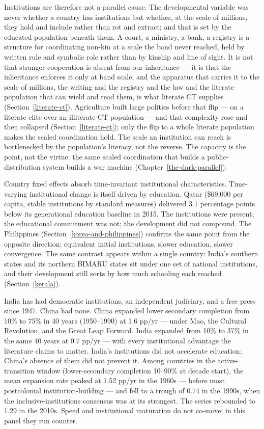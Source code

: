 \documentclass[12pt,letterpaper]{article}
\begin{document}
Institutions are therefore not a parallel cause. The developmental variable was never whether a country has institutions but whether, at the scale of millions, they hold and include rather than rot and extract; and that is set by the educated population beneath them. A court, a ministry, a bank, a registry is a structure for coordinating non-kin at a scale the band never reached, held by written rule and symbolic role rather than by kinship and line of sight. It is not that stranger-cooperation is absent from our inheritance --- it is that the inheritance enforces it only at band scale, and the apparatus that carries it to the scale of millions, the writing and the registry and the law and the literate population that can wield and read them, is what literate CT supplies (Section~\ref{literate-ct}). Agriculture built large polities before that flip --- on a literate elite over an illiterate-CT population --- and that complexity rose and then collapsed (Section~\ref{literate-ct}); only the flip to a whole literate population makes the scaled coordination hold. The scale an institution can reach is bottlenecked by the population's literacy, not the reverse. The capacity is the point, not the virtue: the same scaled coordination that builds a public-distribution system builds a war machine (Chapter~\ref{the-dark-parallel}).

Country fixed effects absorb time-invariant institutional characteristics. Time-varying institutional change is itself driven by education. Qatar (\$69,000 per capita, stable institutions by standard measures) delivered 3.1 percentage points below its generational education baseline in 2015. The institutions were present; the educational commitment was not; the development did not compound. The Philippines (Section~\ref{korea-and-philippines}) confirms the same point from the opposite direction: equivalent initial institutions, slower education, slower convergence. The same contrast appears within a single country: India's southern states and its northern BIMARU states sit under one set of national institutions, and their development still sorts by how much schooling each reached (Section~\ref{kerala}).

India has had democratic institutions, an independent judiciary, and a free press since 1947. China had none. China expanded lower secondary completion from 10\% to 75\% in 40 years (1950--1990) at 1.6 pp/yr --- under Mao, the Cultural Revolution, and the Great Leap Forward. India expanded from 10\% to 37\% in the same 40 years at 0.7 pp/yr --- with every institutional advantage the literature claims to matter. India's institutions did not accelerate education; China's absence of them did not prevent it. Among countries in the active-transition window (lower-secondary completion 10--90\% at decade start), the mean expansion rate peaked at 1.52 pp/yr in the 1960s --- before most postcolonial institution-building --- and fell to a trough of 0.74 in the 1990s, when the inclusive-institutions consensus was at its strongest. The series rebounded to 1.29 in the 2010s. Speed and institutional maturation do not co-move; in this panel they run counter.
\end{document}
